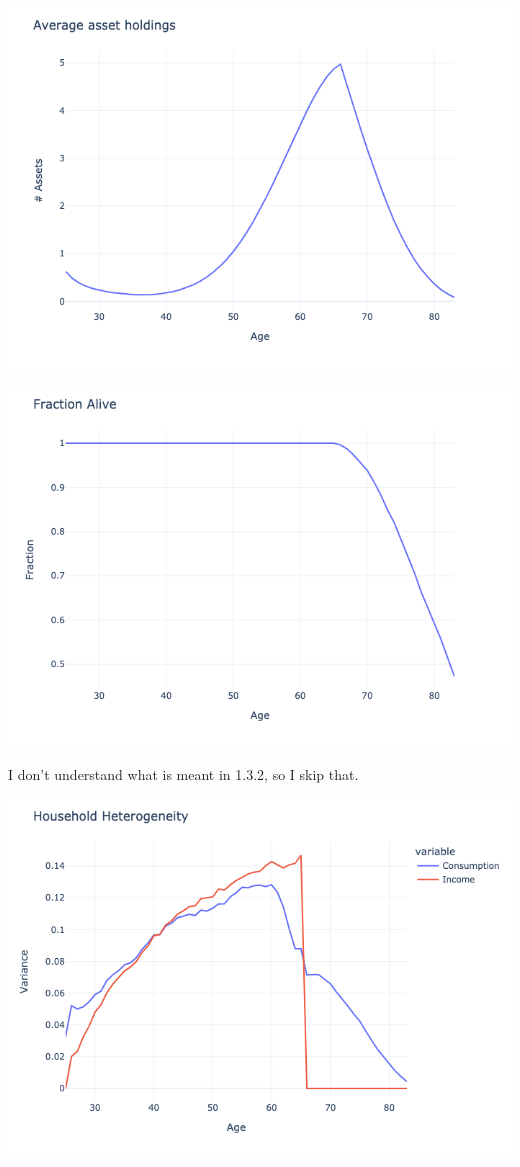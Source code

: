 \begin{questions}
\begin{solution}
\includegraphics[scale=0.5]{figures/mean_assets.png}

\includegraphics[scale=0.5]{figures/fraction_alive.png}

I don't understand what is meant in 1.3.2, so I skip that.

\includegraphics[scale=0.5]{figures/hh_heterogeneity.png}


\end{solution}
\end{questions}

